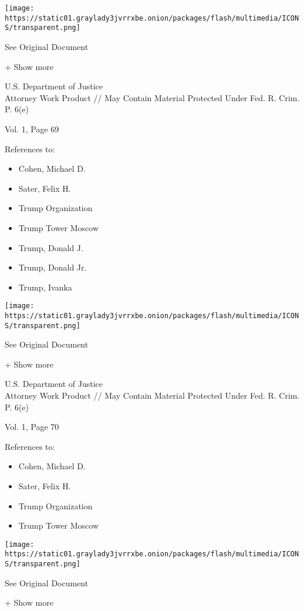 \protect\hyperlink{}{}

\texttt{[image: https://static01.graylady3jvrrxbe.onion/packages/flash/multimedia/ICONS/transparent.png]}

See Original Document

+ Show more

U.S. Department of Justice\\
Attorney Work Product // May Contain Material Protected Under Fed. R.
Crim. P. 6(e)

Vol. 1, Page 69

References to:

\begin{itemize}
\tightlist
\item
  Cohen, Michael D.
\item
  Sater, Felix H.
\item
  Trump Organization
\item
  Trump Tower Moscow
\item
  Trump, Donald J.
\item
  Trump, Donald Jr.
\item
  Trump, Ivanka
\end{itemize}

\protect\hyperlink{}{}

\texttt{[image: https://static01.graylady3jvrrxbe.onion/packages/flash/multimedia/ICONS/transparent.png]}

See Original Document

+ Show more

U.S. Department of Justice\\
Attorney Work Product // May Contain Material Protected Under Fed. R.
Crim. P. 6(e)

Vol. 1, Page 70

References to:

\begin{itemize}
\tightlist
\item
  Cohen, Michael D.
\item
  Sater, Felix H.
\item
  Trump Organization
\item
  Trump Tower Moscow
\end{itemize}

\protect\hyperlink{}{}

\texttt{[image: https://static01.graylady3jvrrxbe.onion/packages/flash/multimedia/ICONS/transparent.png]}

See Original Document

+ Show more


